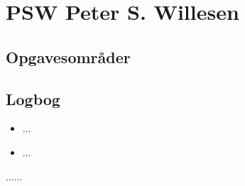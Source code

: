 \section{PSW Peter S. Willesen}

\subsection{Opgavesområder}

\subsection{Logbog}

\begin{uge}

\begin{dage}[Trisdag]
\begin{itemize}

\item ...
\item ...
\end{itemize}
\end{dage}

\begin{dage}[Onsdag]

......

\end{dage}


\end{uge}
